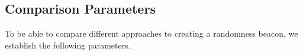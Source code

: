 \subsection{Comparison Parameters}
\label{sub:comparison_parameters}
To be able to compare different approaches to creating a randomness beacon, we establish the following parameters.
%
%
%
